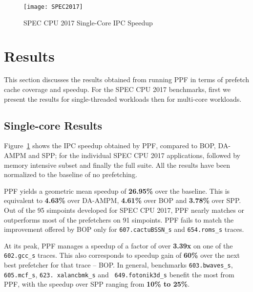 \begin{figure}[ht]
\texttt{[image: SPEC2017]}
\caption{SPEC CPU 2017 Single-Core IPC Speedup}
\label{Fig:SPEC2017_1core}
\end{figure}

\section{Results}
\label{Results}

This section discusses the results obtained from running PPF in terms of
prefetch cache coverage and speedup. For the SPEC CPU 2017 benchmarks, first
we present the results for single-threaded workloads then for multi-core
workloads.

\subsection{Single-core Results}
\label{Results-Single}


Figure~\ref{Fig:SPEC2017_1core} shows the IPC speedup obtained by PPF,
compared to BOP, DA-AMPM and SPP; for the individual SPEC CPU 2017 
applications, followed by memory intensive subset and finally the full
suite. All the results have been normalized to the baseline of no prefetching.


PPF yields a geometric mean speedup of \textbf{26.95\%} over the baseline. 
This is equivalent to \textbf{4.63\%} over DA-AMPM, \textbf{4.61\%} over BOP 
and \textbf{3.78\%} over SPP. Out of the 95 simpoints developed for SPEC 
CPU 2017, PPF nearly matches or outperforms most of the prefetchers on 91 
simpoints. PPF fails to match the improvement offered by BOP only for 
{\tt 607.cactuBSSN\_s} and {\tt 654.roms\_s} traces.

At its peak, PPF manages a speedup of a factor of over \textbf{3.39x} on one of the
{\tt 602.gcc\_s} traces. This also corresponds to speedup gain of
\textbf{60\%} over the next best prefetcher for that trace -- BOP. In general, benchmarks
{\tt 603.bwaves\_s}, {\tt 605.mcf\_s}, {\tt 623. xalancbmk\_s} and {\tt
649.fotonik3d\_s} benefit the most from PPF, with the speedup over SPP ranging
from \textbf{10\% to 25\%}.

